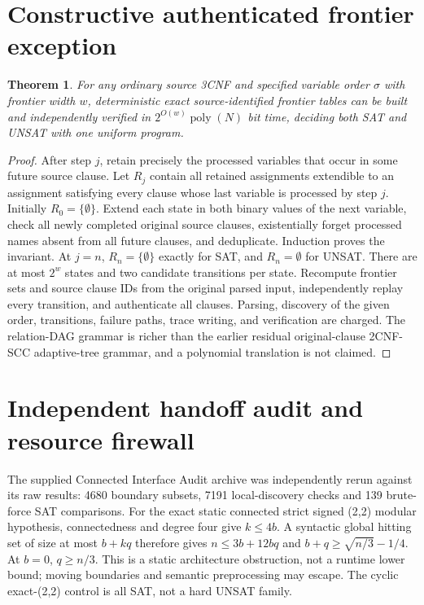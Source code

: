\documentclass[11pt]{article}
\newtheorem{theorem}{Theorem}
\begin{document}
\section{Constructive authenticated frontier exception}
\begin{theorem}
For any ordinary source 3CNF and specified variable order $\sigma$ with frontier width $w$, deterministic exact source-identified frontier tables can be built and independently verified in $2^{O(w)}\operatorname{poly}(N)$ bit time, deciding both SAT and UNSAT with one uniform program.
\end{theorem}
\begin{proof}
After step $j$, retain precisely the processed variables that occur in some future source clause. Let $R_j$ contain all retained assignments extendible to an assignment satisfying every clause whose last variable is processed by step $j$. Initially $R_0=\{\emptyset\}$. Extend each state in both binary values of the next variable, check all newly completed original source clauses, existentially forget processed names absent from all future clauses, and deduplicate. Induction proves the invariant. At $j=n$, $R_n=\{\emptyset\}$ exactly for SAT, and $R_n=\emptyset$ for UNSAT. There are at most $2^w$ states and two candidate transitions per state. Recompute frontier sets and source clause IDs from the original parsed input, independently replay every transition, and authenticate all clauses. Parsing, discovery of the given order, transitions, failure paths, trace writing, and verification are charged. The relation-DAG grammar is richer than the earlier residual original-clause 2CNF-SCC adaptive-tree grammar, and a polynomial translation is not claimed.
\end{proof}

\section{Independent handoff audit and resource firewall}
The supplied Connected Interface Audit archive was independently rerun against its raw results: 4680 boundary subsets, 7191 local-discovery checks and 139 brute-force SAT comparisons. For the exact static connected strict signed (2,2) modular hypothesis, connectedness and degree four give $k\le4b$. A syntactic global hitting set of size at most $b+kq$ therefore gives $n\le3b+12bq$ and $b+q\ge\sqrt{n/3}-1/4$. At $b=0$, $q\ge n/3$. This is a static architecture obstruction, not a runtime lower bound; moving boundaries and semantic preprocessing may escape. The cyclic exact-(2,2) control is all SAT, not a hard UNSAT family.
\end{document}
